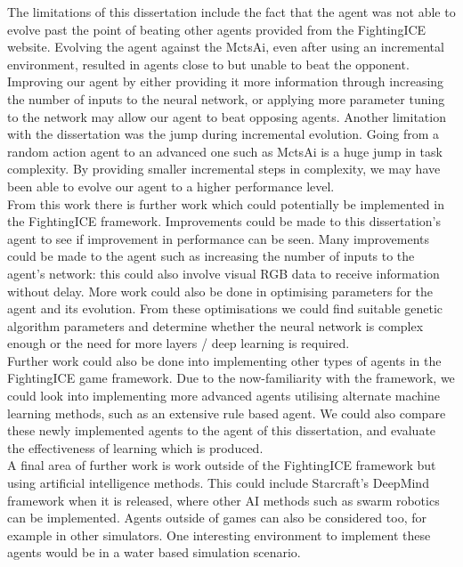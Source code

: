 \documentclass[12pt,a4paper]{article}
\begin{document}
The limitations of this dissertation include the fact that the agent was not able to evolve past the point of beating other agents provided from the FightingICE website. Evolving the agent against the MctsAi, even after using an incremental environment, resulted in agents close to but unable to beat the opponent. Improving our agent by either providing it more information through increasing the number of inputs to the neural network, or applying more parameter tuning to the network may allow our agent to beat opposing agents. Another limitation with the dissertation was the jump during incremental evolution. Going from a random action agent to an advanced one such as MctsAi is a huge jump in task complexity. By providing smaller incremental steps in complexity, we may have been able to evolve our agent to a higher performance level.\\

From this work there is further work which could potentially be implemented in the FightingICE framework. Improvements could be made to this dissertation's agent to see if improvement in performance can be seen. Many improvements could be made to the agent such as increasing the number of inputs to the agent's network: this could also involve visual RGB data to receive information without delay. More work could also be done in optimising parameters for the agent and its evolution. From these optimisations we could find suitable genetic algorithm parameters and determine whether the neural network is complex enough or the need for more layers / deep learning is required.\\
\newpage
Further work could also be done into implementing other types of agents in the FightingICE game framework. Due to the now-familiarity with the framework, we could look into implementing more advanced agents utilising alternate machine learning methods, such as an extensive rule based agent. We could also compare these newly implemented agents to the agent of this dissertation, and evaluate the effectiveness of learning which is produced.\\

A final area of further work is work outside of the FightingICE framework but using artificial intelligence methods. This could include Starcraft's DeepMind framework when it is released, where other AI methods such as swarm robotics can be implemented. Agents outside of games can also be considered too, for example in other simulators. One interesting environment to implement these agents would be in a water based simulation scenario.
\end{document}
